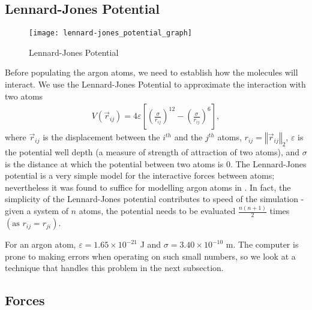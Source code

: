 \documentclass[../Main.tex]{subfiles}
\begin{document}
\subsection{Lennard-Jones Potential}

\begin{wrapfigure}{r}{0.4\textwidth}
\centering
\texttt{[image: lennard-jones\_potential\_graph]}
\caption{Lennard-Jones Potential}
\label{fig:lennard-jones_potential}
\end{wrapfigure}

Before populating the argon atoms, we need to establish how the molecules will interact. We use the Lennard-Jones Potential to approximate the interaction with two atoms
\begin{align}
	V\left(\vec{r}_{ij}\right) = 4\varepsilon \left[ \left( \frac{\sigma}{r_{ij}}\right)^{12} - \left( \frac{\sigma}{r_{ij}}\right)^{6} \right], \label{eqn:lennard-jones_potential}
\end{align}
where $\vec{r}_{ij}$ is the displacement between the $i^{th}$ and the $j^{th}$ atoms, $r_{ij} = \left\Vert\vec{r}_{ij}\right\Vert_{2}$, $\varepsilon$ is the potential well depth (a measure of strength of attraction of two atoms), and $\sigma$ is the distance at which the potential between two atoms is 0. The Lennard-Jones potential is a very simple model for the interactive forces between atoms; nevertheless it was found to suffice for modelling argon atoms in \cite{Rahman1964}. In fact, the simplicity of the Lennard-Jones potential contributes to speed of the simulation - given a system of $n$ atoms, the potential needs to be evaluated $\frac{n\left(n+1\right)}{2}$ times $\left(\mbox{as }r_{ij} = r_{ji}\right)$.

For an argon atom, $\varepsilon = 1.65 \times 10^{-21}$ J and $\sigma = 3.40 \times 10^{-10}$ m. The computer is prone to making errors when operating on such small numbers, so we look at a technique that handles this problem in the next subsection.

\subsection{Forces}
\end{document}
